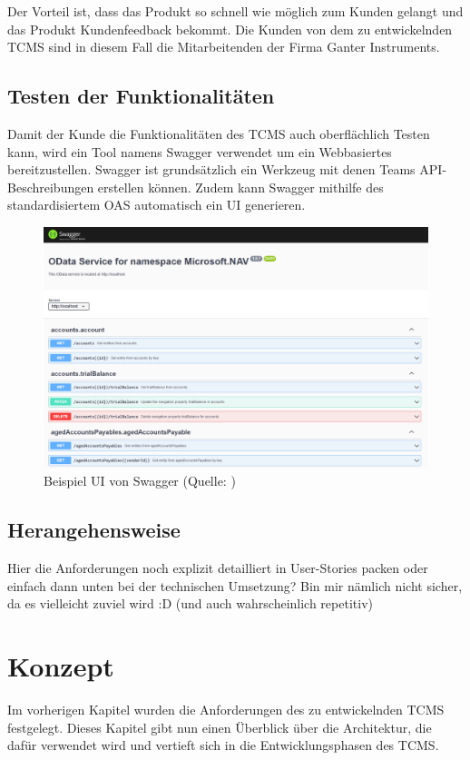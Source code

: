 \documentclass[a4paper, fontsize=11pt, parskip=half, twoside]{scrreprt}
\begin{document}
	Der Vorteil ist, dass das Produkt so schnell wie möglich zum Kunden gelangt und das Produkt Kundenfeedback bekommt.
	Die Kunden von dem zu entwickelnden \ac{TCMS} sind in diesem Fall die Mitarbeitenden der Firma Ganter Instruments.
	
	\textcite{alliance_what_2017}
	
	
	\section{Testen der Funktionalitäten}
	Damit der Kunde die Funktionalitäten des \ac{TCMS} auch oberflächlich Testen kann, wird ein Tool namens Swagger verwendet um ein Webbasiertes  bereitzustellen.
	Swagger ist grundsätzlich ein Werkzeug mit denen Teams \ac{API}-Beschreibungen erstellen können.
	Zudem kann Swagger mithilfe des standardisiertem \ac{OAS} automatisch ein \ac{UI} generieren.
	
	\textcite{noauthor_api_nodate}
	
	\begin{figure}[H]
		\centering
		\includegraphics[scale=0.6]{assets/swaggerui.png}
		\caption{Beispiel \ac{UI} von Swagger (Quelle: \textcite{noauthor_host_nodate})}
	\end{figure}

	\section{Herangehensweise}
	Hier die Anforderungen noch explizit detailliert in User-Stories packen oder einfach dann unten bei der technischen Umsetzung? Bin mir nämlich nicht sicher, da es vielleicht zuviel wird :D (und auch wahrscheinlich repetitiv)
	
	
	\chapter{Konzept}
	Im vorherigen Kapitel wurden die Anforderungen des zu entwickelnden \ac{TCMS} festgelegt.
	Dieses Kapitel gibt nun einen Überblick über die Architektur, die dafür verwendet wird und vertieft sich in die Entwicklungsphasen des \ac{TCMS}.
	
\end{document}
